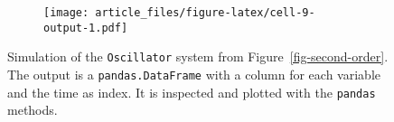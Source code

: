\begin{figure}[t]
\begin{minipage}[t]{0.50\linewidth}
{\begin{figure}[H]

{\centering \texttt{[image: article\_files/figure-latex/cell-9-output-1.pdf]}

}

\end{figure}

}

\end{minipage}%

\caption{\label{fig-sim}Simulation of the \texttt{Oscillator} system
from Figure~\ref{fig-second-order}. The output is a
\texttt{pandas.DataFrame} with a column for each variable and the time
as index. It is inspected and plotted with the \texttt{pandas} methods.}

\end{figure}
